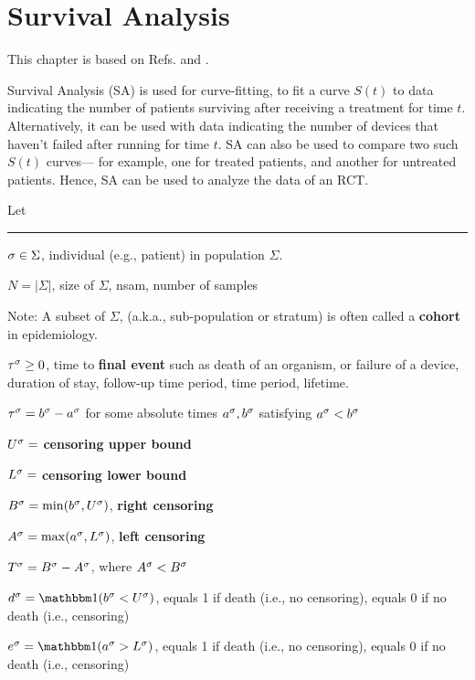 \chapter{Survival Analysis}
\label{ch-survival}

This chapter is based
on Refs.\cite{lily-xu-284} and \cite{wiki-survival-anal}.

Survival Analysis (SA) is used for curve-fitting, to
fit a curve $S(t)$ to data indicating the number of patients surviving
after receiving a treatment for time $t$.
Alternatively, it can be used with data indicating  the number of
devices that haven't failed after running for time $t$.
SA can also be used  to compare two such $S(t)$ curves---
for example, one for treated patients, and another for untreated
patients. Hence, SA can be used to analyze the data of an RCT.

Let
\hrule

$\sigma\in \Sigma$, individual (e.g., patient) in population $\Sigma$.

$N=|\Sigma|$,  size of $\Sigma$, nsam, number of samples

Note: A subset of $\Sigma$, (a.k.a., sub-population
or stratum)
is often called a {\bf cohort}
in epidemiology.

$\tau^\sigma\geq 0$, time to
{\bf final event} such as death of an organism, or failure
of a device, duration of stay,
follow-up time period,
time period,
lifetime.

$\tau^\sigma = b^\sigma -a^\sigma$ for some absolute times
$a^\sigma, b^\sigma$ satisfying
$a^\sigma<b^\sigma$

$U^\sigma=$ {\bf censoring upper bound}

$L^\sigma=$ {\bf censoring lower bound}

$B^\sigma = \min(b^\sigma, U^\sigma)$, {\bf right censoring}

$A^\sigma = \max(a^\sigma, L^\sigma)$, {\bf left censoring}

$T^\sigma = B^\sigma - A^\sigma$, where $A^\sigma<B^\sigma$

$d^\s = \indi(b^\s < U^\s)$, equals 1
if death (i.e., no censoring),
equals 0 if no death (i.e., censoring)

$e^\s = \indi(a^\s > L^\s)$, equals 1
if death (i.e., no censoring),
equals 0 if no death (i.e., censoring)


